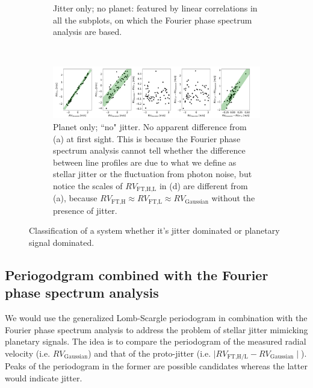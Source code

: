 \begin{figure}[htbp]
\begin{subfigure}[b]{1.0\textwidth}
        \caption{Jitter only; no planet: featured by linear correlations in all the subplots, on which the Fourier phase spectrum analysis are based.}
    \end{subfigure}	    
	~
    \begin{subfigure}[b]{1.0\textwidth}
        \includegraphics[width=\textwidth]{./Figures/Methods/Correlation_0jitter.png}
        \caption{Planet only; ``no" jitter. No apparent difference from (a) at first sight. This is because the Fourier phase spectrum analysis cannot tell whether the difference between line profiles are due to what we define as stellar jitter or the fluctuation from photon noise, but notice the scales of $RV_\text{FT,H,L}$ in (d) are different from (a), because $RV_\text{FT,H} \approx RV_\text{FT,L} \approx RV_\text{Gaussian}$ without the presence of jitter. }
    \end{subfigure}	    
    \caption[Classification of jitter dominated or planetary signal dominated]        
    {Classification of a system whether it's jitter dominated or planetary signal dominated.}
\label{fig:correlations}
\end{figure}    
\FloatBarrier


\subsection{Periogodgram combined with the Fourier phase spectrum analysis}

We would use the generalized Lomb-Scargle periodogram \cite{Zechmeister2009} in combination with the Fourier phase spectrum analysis to address the problem of stellar jitter mimicking planetary signals. The idea is to compare the periodogram of the measured radial velocity (i.e. $RV_\text{Gaussian}$) and that of the proto-jitter (i.e. $\mid RV_\text{FT,H/L} - RV_\text{Gaussian} \mid$). Peaks of the periodogram in the former are possible candidates whereas the latter would indicate jitter. 


